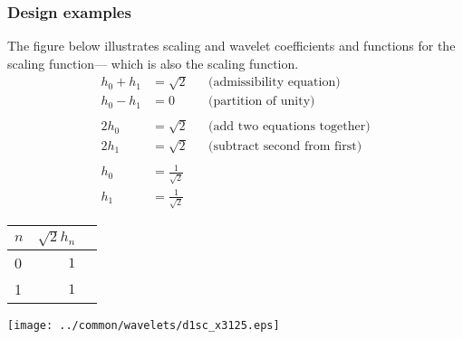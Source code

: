 \subsubsection{Design examples}
\begin{example}
\label{ex:sw_gh_d1}
The figure below illustrates scaling and wavelet coefficients and functions
for the  scaling function---
which is also the  scaling function.
\begin{align*}
  h_0 + h_1 &= \sqrt{2}    &&\text{(admissibility equation)} \\
  h_0 - h_1 &= 0           &&\text{(partition of unity)}  \\
  \\
  2h_0 &= \sqrt{2}         &&\text{(add two equations together)}\\
  2h_1 &= \sqrt{2}         &&\text{(subtract second from first)} \\
  \\
  h_0 &= \frac{1}{\sqrt{2}} \\
  h_1 &= \frac{1}{\sqrt{2}} 
\end{align*}

  \parbox[b][35\tw/160][c]{5\tw/16}{\begin{tabular}[b]{l|r|r}
    $n$ & $\sqrt{2} h_n $  \\
    \hline
    0   & $1$    \\
    1   & $1$  
  \end{tabular}}
  \texttt{[image: ../common/wavelets/d1sc\_x3125.eps]}
\end{example}

